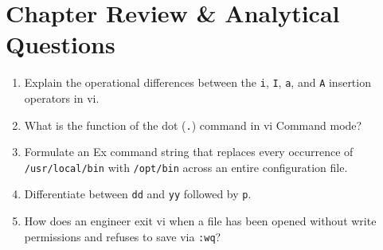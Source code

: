 \section{Chapter Review \& Analytical Questions}
\begin{enumerate}[leftmargin=1.5em]
    \item Explain the operational differences between the \texttt{i}, \texttt{I}, \texttt{a}, and \texttt{A} insertion operators in vi.
    \item What is the function of the dot (\texttt{.}) command in vi Command mode?
    \item Formulate an Ex command string that replaces every occurrence of \texttt{/usr/local/bin} with \texttt{/opt/bin} across an entire configuration file.
    \item Differentiate between \texttt{dd} and \texttt{yy} followed by \texttt{p}.
    \item How does an engineer exit vi when a file has been opened without write permissions and refuses to save via \texttt{:wq}?
\end{enumerate}
